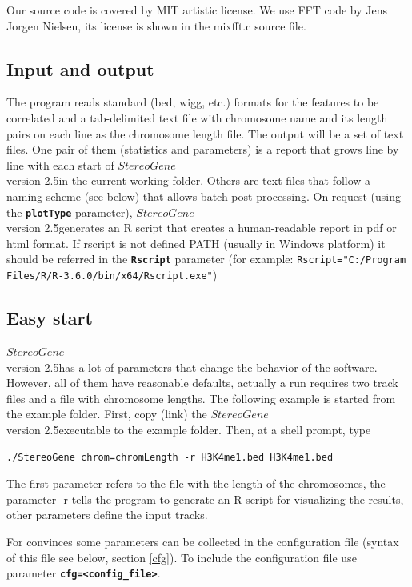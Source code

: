 \documentclass{article}
\newcommand{\prm}[1]{\texttt{\textbf{{#1}}}}
\newcommand{\sg}{$StereoGene$\\ version 2.5}
\begin{document}
Our source code is covered by MIT artistic license. We use FFT code by Jens Jorgen Nielsen, its license is shown in the mixfft.c source file.

\subsection{Input and output}
The program reads standard (bed, wigg, etc.) formats for the features to be correlated and a tab-delimited text file with chromosome name and its length pairs on each line as the chromosome length file. The output will be a set of text files. One pair of them (statistics and parameters) is a report that grows line by line with each start of \sg in the current working folder. Others are text files that follow a naming scheme (see below) that allows batch post-processing. On request (using the \prm{plotType} parameter), \sg generates an R script that creates a human-readable report in pdf or html format. If rscript is not defined PATH (usually in Windows platform) it should be referred in the \prm{Rscript} parameter (for example: \texttt{Rscript="C:/Program Files/R/R-3.6.0/bin/x64/Rscript.exe"})
\subsection{Easy start}
\sg has a lot of parameters that change the behavior of the software.  However, all of them have reasonable defaults, actually a run requires two track files and a file with chromosome lengths. The following example is started from the example folder. First, copy (link) the \sg executable to the example folder. Then, at a shell prompt, type \vspace{0.5cm}

\begin{center}
\texttt{./StereoGene chrom=chromLength -r H3K4me1.bed H3K4me1.bed}\vspace{0.5cm}
\end{center}

The first parameter refers to the file with the length of the chromosomes, the parameter -r tells the program to generate an R script for visualizing the results, other parameters define the input tracks.

For convinces some parameters can be collected in the configuration file (syntax of this file see below, section \ref{cfg}).
To include the configuration file use parameter \prm{cfg=<config\_file>}.
\end{document}
